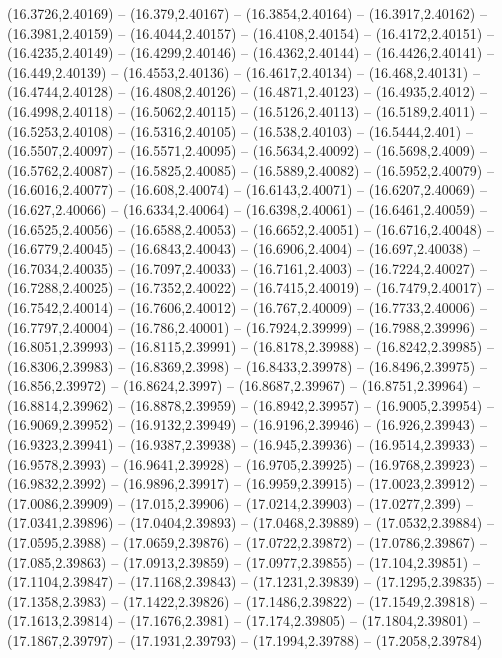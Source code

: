 {(16.3726,2.40169) -- (16.379,2.40167) -- (16.3854,2.40164) -- (16.3917,2.40162) -- (16.3981,2.40159) -- (16.4044,2.40157) -- (16.4108,2.40154) -- (16.4172,2.40151) -- (16.4235,2.40149) -- (16.4299,2.40146) -- (16.4362,2.40144) -- (16.4426,2.40141)
-- (16.449,2.40139) -- (16.4553,2.40136) -- (16.4617,2.40134) -- (16.468,2.40131) -- (16.4744,2.40128) -- (16.4808,2.40126) -- (16.4871,2.40123) -- (16.4935,2.4012) -- (16.4998,2.40118) -- (16.5062,2.40115) -- (16.5126,2.40113) -- (16.5189,2.4011)
-- (16.5253,2.40108) -- (16.5316,2.40105) -- (16.538,2.40103) -- (16.5444,2.401) -- (16.5507,2.40097) -- (16.5571,2.40095) -- (16.5634,2.40092) -- (16.5698,2.4009) -- (16.5762,2.40087) -- (16.5825,2.40085) -- (16.5889,2.40082) -- (16.5952,2.40079)
-- (16.6016,2.40077) -- (16.608,2.40074) -- (16.6143,2.40071) -- (16.6207,2.40069) -- (16.627,2.40066) -- (16.6334,2.40064) -- (16.6398,2.40061) -- (16.6461,2.40059) -- (16.6525,2.40056) -- (16.6588,2.40053) -- (16.6652,2.40051) -- (16.6716,2.40048)
-- (16.6779,2.40045) -- (16.6843,2.40043) -- (16.6906,2.4004) -- (16.697,2.40038) -- (16.7034,2.40035) -- (16.7097,2.40033) -- (16.7161,2.4003) -- (16.7224,2.40027) -- (16.7288,2.40025) -- (16.7352,2.40022) -- (16.7415,2.40019) -- (16.7479,2.40017)
-- (16.7542,2.40014) -- (16.7606,2.40012) -- (16.767,2.40009) -- (16.7733,2.40006) -- (16.7797,2.40004) -- (16.786,2.40001) -- (16.7924,2.39999) -- (16.7988,2.39996) -- (16.8051,2.39993) -- (16.8115,2.39991) -- (16.8178,2.39988) -- (16.8242,2.39985)
-- (16.8306,2.39983) -- (16.8369,2.3998) -- (16.8433,2.39978) -- (16.8496,2.39975) -- (16.856,2.39972) -- (16.8624,2.3997) -- (16.8687,2.39967) -- (16.8751,2.39964) -- (16.8814,2.39962) -- (16.8878,2.39959) -- (16.8942,2.39957) -- (16.9005,2.39954)
-- (16.9069,2.39952) -- (16.9132,2.39949) -- (16.9196,2.39946) -- (16.926,2.39943) -- (16.9323,2.39941) -- (16.9387,2.39938) -- (16.945,2.39936) -- (16.9514,2.39933) -- (16.9578,2.3993) -- (16.9641,2.39928) -- (16.9705,2.39925) -- (16.9768,2.39923)
-- (16.9832,2.3992) -- (16.9896,2.39917) -- (16.9959,2.39915) -- (17.0023,2.39912) -- (17.0086,2.39909) -- (17.015,2.39906) -- (17.0214,2.39903) -- (17.0277,2.399) -- (17.0341,2.39896) -- (17.0404,2.39893) -- (17.0468,2.39889) -- (17.0532,2.39884)
-- (17.0595,2.3988) -- (17.0659,2.39876) -- (17.0722,2.39872) -- (17.0786,2.39867) -- (17.085,2.39863) -- (17.0913,2.39859) -- (17.0977,2.39855) -- (17.104,2.39851) -- (17.1104,2.39847) -- (17.1168,2.39843) -- (17.1231,2.39839) -- (17.1295,2.39835)
-- (17.1358,2.3983) -- (17.1422,2.39826) -- (17.1486,2.39822) -- (17.1549,2.39818) -- (17.1613,2.39814) -- (17.1676,2.3981) -- (17.174,2.39805) -- (17.1804,2.39801) -- (17.1867,2.39797) -- (17.1931,2.39793) -- (17.1994,2.39788) -- (17.2058,2.39784)
}
